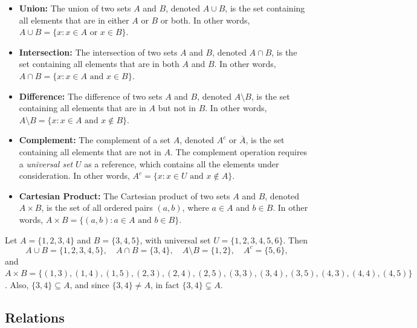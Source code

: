 \begin{itemize}

\item \textbf{Union:} The union of two sets $A$ and $B$, denoted $A \cup B$, is the set containing all elements that are in either $A$ or $B$ or both. In other words, $A \cup B = \{x:x \in A \text{ or } x \in B\}$.

    \item \textbf{Intersection:} The intersection of two sets $A$ and $B$, denoted $A \cap B$, is the set containing all elements that are in both $A$ and $B$. In other words, $A \cap B = \{x:x \in A \text{ and } x \in B\}$.

    \item \textbf{Difference:} The difference of two sets $A$ and $B$, denoted $A \setminus B$, is the set containing all elements that are in $A$ but not in $B$. In other words, $A \setminus B = \{x:x \in A \text{ and } x \notin B \}$.

    \item \textbf{Complement:} The complement of a set $A$, denoted $A^c$ or $\overline{A}$, is the set containing all elements that are not in $A$. The complement operation requires a \textit{universal set} $U$ as a reference, which contains all the elements under consideration. In other words, $A^c = \{x:x \in U \text{ and } x \notin A\}$.

    \item \textbf{Cartesian Product:} The Cartesian product of two sets $A$ and $B$, denoted $A \times B$, is the set of all ordered pairs $(a, b)$, where $a \in A$ and $b \in B$. In other words, $A \times B = \{(a,b):a \in A \text{ and } b \in B\}$.

\end{itemize}

\begin{example}
Let $A = \{1, 2, 3, 4\}$ and $B = \{3, 4, 5\}$, with universal set $U = \{1, 2, 3, 4, 5, 6\}$. Then
\[
A \cup B = \{1,2,3,4,5\}, \quad A \cap B = \{3,4\}, \quad A \setminus B = \{1,2\}, \quad A^c = \{5,6\},
\]
and $A \times B = \{(1,3),(1,4),(1,5),(2,3),(2,4),(2,5),(3,3),(3,4),(3,5),(4,3),(4,4),(4,5)\}$. Also, $\{3,4\} \subseteq A$, and since $\{3,4\} \neq A$, in fact $\{3,4\} \subsetneq A$.
\end{example}

\subsection{Relations}


